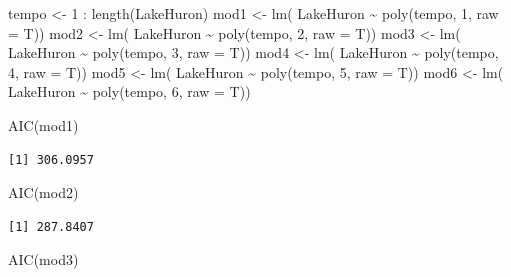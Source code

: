 \documentclass[
  letterpaper,
  DIV=11,
  numbers=noendperiod]{scrartcl}
\newenvironment{Shaded}{\begin{snugshade}}{\end{snugshade}}
\newcommand{\AttributeTok}[1]{\textcolor[rgb]{0.40,0.45,0.13}{#1}}
\newcommand{\DecValTok}[1]{\textcolor[rgb]{0.68,0.00,0.00}{#1}}
\newcommand{\FunctionTok}[1]{\textcolor[rgb]{0.28,0.35,0.67}{#1}}
\newcommand{\NormalTok}[1]{\textcolor[rgb]{0.00,0.23,0.31}{#1}}
\newcommand{\OtherTok}[1]{\textcolor[rgb]{0.00,0.23,0.31}{#1}}
\newcommand{\SpecialCharTok}[1]{\textcolor[rgb]{0.37,0.37,0.37}{#1}}
\theoremstyle{definition}
\theoremstyle{definition}
\theoremstyle{plain}
\theoremstyle{plain}
\theoremstyle{remark}
\begin{document}
\begin{Shaded}
\begin{Highlighting}[]
\NormalTok{tempo }\OtherTok{\textless{}{-}} \DecValTok{1} \SpecialCharTok{:} \FunctionTok{length}\NormalTok{(LakeHuron)}
\NormalTok{mod1 }\OtherTok{\textless{}{-}} \FunctionTok{lm}\NormalTok{( LakeHuron }\SpecialCharTok{\textasciitilde{}} \FunctionTok{poly}\NormalTok{(tempo, }\DecValTok{1}\NormalTok{, }\AttributeTok{raw =}\NormalTok{ T))}
\NormalTok{mod2 }\OtherTok{\textless{}{-}} \FunctionTok{lm}\NormalTok{( LakeHuron }\SpecialCharTok{\textasciitilde{}} \FunctionTok{poly}\NormalTok{(tempo, }\DecValTok{2}\NormalTok{, }\AttributeTok{raw =}\NormalTok{ T))}
\NormalTok{mod3 }\OtherTok{\textless{}{-}} \FunctionTok{lm}\NormalTok{( LakeHuron }\SpecialCharTok{\textasciitilde{}} \FunctionTok{poly}\NormalTok{(tempo, }\DecValTok{3}\NormalTok{, }\AttributeTok{raw =}\NormalTok{ T))}
\NormalTok{mod4 }\OtherTok{\textless{}{-}} \FunctionTok{lm}\NormalTok{( LakeHuron }\SpecialCharTok{\textasciitilde{}} \FunctionTok{poly}\NormalTok{(tempo, }\DecValTok{4}\NormalTok{, }\AttributeTok{raw =}\NormalTok{ T))}
\NormalTok{mod5 }\OtherTok{\textless{}{-}} \FunctionTok{lm}\NormalTok{( LakeHuron }\SpecialCharTok{\textasciitilde{}} \FunctionTok{poly}\NormalTok{(tempo, }\DecValTok{5}\NormalTok{, }\AttributeTok{raw =}\NormalTok{ T))}
\NormalTok{mod6 }\OtherTok{\textless{}{-}} \FunctionTok{lm}\NormalTok{( LakeHuron }\SpecialCharTok{\textasciitilde{}} \FunctionTok{poly}\NormalTok{(tempo, }\DecValTok{6}\NormalTok{, }\AttributeTok{raw =}\NormalTok{ T))}

\FunctionTok{AIC}\NormalTok{(mod1)}
\end{Highlighting}
\end{Shaded}

\begin{verbatim}
[1] 306.0957
\end{verbatim}

\begin{Shaded}
\begin{Highlighting}[]
\FunctionTok{AIC}\NormalTok{(mod2)}
\end{Highlighting}
\end{Shaded}

\begin{verbatim}
[1] 287.8407
\end{verbatim}

\begin{Shaded}
\begin{Highlighting}[]
\FunctionTok{AIC}\NormalTok{(mod3)}
\end{Highlighting}
\end{Shaded}
\end{document}
